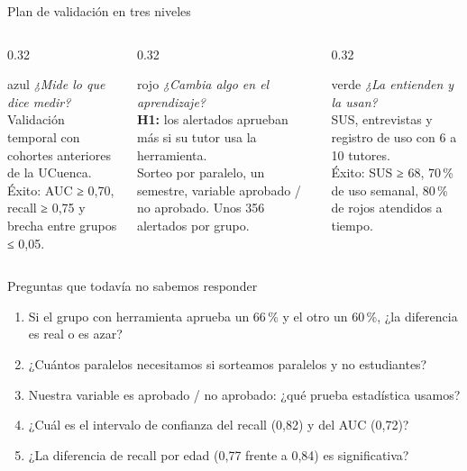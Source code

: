 \documentclass[aspectratio=169,10pt]{beamer}
\begin{document}
\begin{frame}{Plan de validación en tres niveles}
\begin{columns}[T]
\begin{column}{0.32\textwidth}
\begin{tarjeta}{azul}\footnotesize
\emph{¿Mide lo que dice medir?}\\[4pt]
Validación temporal con cohortes anteriores de la UCuenca.\\[3pt]
Éxito: AUC ≥ 0,70, recall ≥ 0,75 y brecha entre grupos ≤ 0,05.
\end{tarjeta}
\end{column}
\begin{column}{0.32\textwidth}
\begin{tarjeta}{rojo}\footnotesize
\emph{¿Cambia algo en el aprendizaje?}\\[4pt]
\textbf{H1:} los alertados aprueban más si su tutor usa la herramienta.\\[3pt]
Sorteo por paralelo, un semestre, variable aprobado / no aprobado. Unos 356 alertados por grupo.
\end{tarjeta}
\end{column}
\begin{column}{0.32\textwidth}
\begin{tarjeta}{verde}\footnotesize
\emph{¿La entienden y la usan?}\\[4pt]
SUS, entrevistas y registro de uso con 6 a 10 tutores.\\[3pt]
Éxito: SUS ≥ 68, 70\,\% de uso semanal, 80\,\% de rojos atendidos a tiempo.
\end{tarjeta}
\end{column}
\end{columns}
\end{frame}

\begin{frame}{Preguntas que todavía no sabemos responder}
\begin{enumerate}
\setlength{\itemsep}{5pt}
\item Si el grupo con herramienta aprueba un 66\,\% y el otro un 60\,\%, ¿la diferencia es real o es azar?
\item ¿Cuántos paralelos necesitamos si sorteamos paralelos y no estudiantes?
\item Nuestra variable es aprobado / no aprobado: ¿qué prueba estadística usamos?
\item ¿Cuál es el intervalo de confianza del recall (0,82) y del AUC (0,72)?
\item ¿La diferencia de recall por edad (0,77 frente a 0,84) es significativa?
\end{enumerate}
\end{frame}
\end{document}
